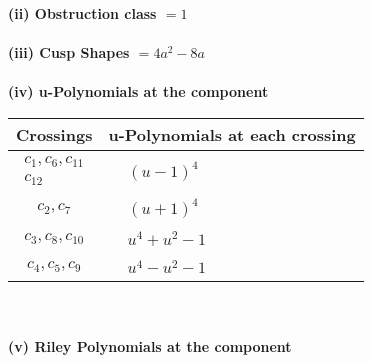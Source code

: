 \documentclass[1p]{elsarticle_modified}
\theoremstyle{definition}
\begin{document}
\flushleft \textbf{(ii) Obstruction class $= 1$}\\~\\
\flushleft \textbf{(iii) Cusp Shapes $= 4 a^2-8 a$}\\~\\
\newpage\renewcommand{\arraystretch}{1}
\flushleft \textbf{(iv) u-Polynomials at the component}\newline \\
\begin{tabular}{m{50pt}|m{274pt}}
Crossings & \hspace{64pt}u-Polynomials at each crossing \\
\hline $$\begin{aligned}c_{1},c_{6},c_{11}\\c_{12}\end{aligned}$$&$\begin{aligned}
&(u-1)^4
\end{aligned}$\\
\hline $$\begin{aligned}c_{2},c_{7}\end{aligned}$$&$\begin{aligned}
&(u+1)^4
\end{aligned}$\\
\hline $$\begin{aligned}c_{3},c_{8},c_{10}\end{aligned}$$&$\begin{aligned}
&u^4+u^2-1
\end{aligned}$\\
\hline $$\begin{aligned}c_{4},c_{5},c_{9}\end{aligned}$$&$\begin{aligned}
&u^4- u^2-1
\end{aligned}$\\
\hline
\end{tabular}\\~\\
\newpage\renewcommand{\arraystretch}{1}
\flushleft \textbf{(v) Riley Polynomials at the component}\newline \\
\end{document}
